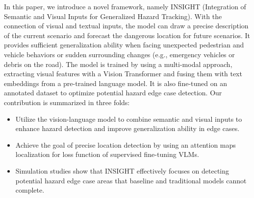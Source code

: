 In this paper, we introduce a novel framework, namely INSIGHT (Integration of Semantic and Visual Inputs for Generalized Hazard Tracking). 
With the connection of visual and textual inputs, the model can draw a precise description of the current scenario and forecast the dangerous location for future scenarios. It provides sufficient generalization ability when facing unexpected pedestrian and vehicle behaviors or sudden surrounding changes (e.g., emergency vehicles or debris on the road). The model is trained by using a multi-modal approach, extracting visual features with a Vision Transformer and fusing them with text embeddings from a pre-trained language model. It is also fine-tuned on an annotated dataset to optimize potential hazard edge case detection.
% 
Our contribution is summarized in three folds: 
\begin{itemize}
    \item Utilize the vision-language model to combine semantic and visual inputs to enhance hazard detection and improve generalization ability in edge cases.
    \item Achieve the goal of precise location detection by using an attention maps localization for loss function of supervised fine-tuning VLMs.
    \item Simulation studies show that INSIGHT effectively focuses on detecting potential hazard edge case areas that baseline and traditional models cannot complete.
    \end{itemize}
